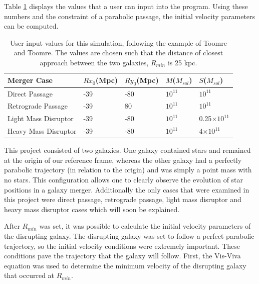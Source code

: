 \documentclass[11pt]{article}
\begin{document}
Table \ref{table2} displays the values that a user can input into the program. Using these numbers and the constraint of a parabolic passage, the initial velocity parameters can be computed.

\begin{table}[h!]
\centering
\caption{User input values for this simulation, following the example of Toomre and Toomre.  The values are chosen such that the distance of closest approach between the two galaxies, $R_{min}$ is 25 kpc.}
\begin{tabular}{l l l l l}
Merger Case & $Rx_0$(Mpc) & $Ry_0$(Mpc) & $M$($M_{sol}$) & $S$($M_{sol}$) \\
\hline	%
Direct Passage & -39 & -80 & $10^{11}$ & $10^{11}$ \\
Retrograde Passage & -39 & 80 & $10^{11}$ & $10^{11}$ \\
Light Mass Disruptor & -39 & -80 & $10^{11}$ & 0.25$\times10^{11}$ \\
Heavy Mass Disruptor & -39 & -80 & $10^{11}$ & 4$\times10^{11}$ \\
\end{tabular}
\label{table2}
\end{table}


This project consisted of two galaxies.  One galaxy contained stars and remained at the origin of our reference frame, whereas the other galaxy had a perfectly parabolic trajectory (in relation to the origin) and was simply a point mass with no stars.  This configuration allows one to clearly observe the evolution of star positions in a galaxy merger.  Additionally the only cases that were examined in this project were direct passage, retrograde passage, light mass disruptor and heavy mass disruptor cases which will soon be explained. 

After $R_{min}$ was set, it was possible to calculate the initial velocity parameters of the disrupting galaxy.  The disrupting galaxy was set to follow a perfect parabolic trajectory, so the initial velocity conditions were extremely important. These conditions pave the trajectory that the galaxy will follow.  First, the Vis-Viva equation was used to determine the minimum velocity of the disrupting galaxy that occurred at $R_{min}$.  
\end{document}
